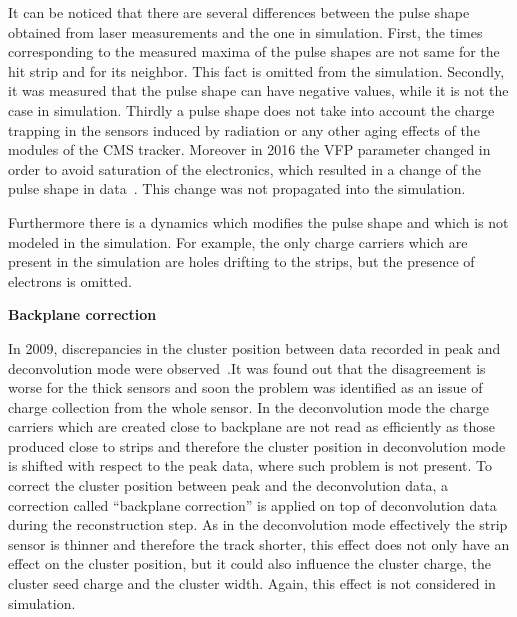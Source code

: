 It can be noticed that there are several differences between the pulse shape obtained from laser measurements and the one in simulation. First, the times corresponding to the measured maxima of the pulse shapes are not same for the hit strip and for its neighbor. This fact is omitted from the simulation. Secondly, it was measured that the pulse shape can have negative values, while it is not the case in simulation. Thirdly a pulse shape does not take into account the charge trapping in the sensors induced by radiation or any other aging effects of the modules of the CMS tracker. Moreover in 2016 the VFP parameter changed in order to avoid saturation of the electronics, which resulted in a change of the pulse shape in data~\cite{website:vfp}. This change was not propagated into the simulation.

Furthermore there is a dynamics which modifies the pulse shape and which is not modeled in the simulation. For example, the only charge carriers which are present in the simulation are holes drifting to the strips, but the presence of electrons is omitted.

\textbf{Backplane correction}

In 2009, discrepancies in the cluster position between data recorded in peak and deconvolution mode were observed~\cite{website:backplane}.It was found out that the disagreement is worse for the thick sensors and soon the problem was identified as an issue of charge collection from the whole sensor. In the deconvolution mode the charge carriers which are created close to backplane are not read as efficiently as those produced close to strips and therefore the cluster position in deconvolution mode is shifted with respect to the peak data, where such problem is not present. To correct the cluster position between peak and the deconvolution data, a correction called ``backplane correction'' is applied on top of deconvolution data during the reconstruction step. As in the deconvolution mode effectively the strip sensor is thinner and therefore the track shorter, this effect does not only have an effect on the cluster position, but it could also influence the cluster charge, the cluster seed charge and the cluster width. Again, this effect is not considered in simulation.




